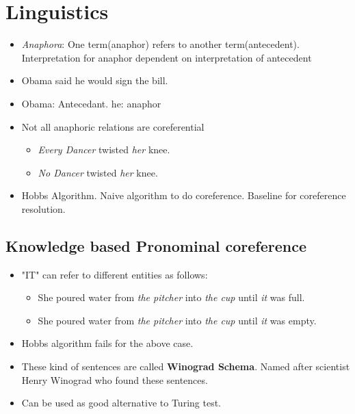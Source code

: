 \documentclass[a4paper]{article}
\begin{document}
\section{Linguistics}
\begin{itemize}
    \item \textit{Anaphora}: One term(anaphor) refers to another term(antecedent). Interpretation for anaphor dependent on interpretation of antecedent
    \item Obama said he would sign the bill.
    \item Obama: Antecedant. he: anaphor
    \item Not all anaphoric relations are coreferential
    \begin{itemize}
        \item \textit{Every Dancer} twisted \textit{her} knee.
        \item \textit{No Dancer} twisted \textit{her} knee.
    \end{itemize}
    \item Hobbs Algorithm. Naive algorithm to do coreference. Baseline for coreference resolution.
\end{itemize}
\subsection{Knowledge based Pronominal coreference}
\begin{itemize}
    \item "IT" can refer to different entities as follows:
    \begin{itemize}
        \item She poured water from \textit{the pitcher} into \textit{the cup} until \textit{it} was full.
        \item She poured water from \textit{the pitcher} into \textit{the cup} until \textit{it} was empty.
    \end{itemize}
    \item Hobbs algorithm fails for the above case.
    \item These kind of sentences are called \textbf{Winograd Schema}. Named after scientist Henry Winograd who found these sentences. 
    \item Can be used as good alternative to Turing test.
\end{itemize}
\end{document}
